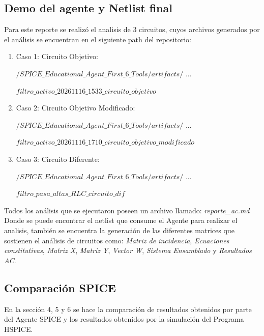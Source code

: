 \subsection{Demo del agente y Netlist final}
Para este reporte se realizó el analisis de 3 circuitos, cuyos archivos generados por el análisis se encuentran en el siguiente path del repositorio:

\begin{enumerate}
\item Caso 1: Circuito Objetivo:

$/SPICE\_Educational\_Agent\_First\_6\_Tools/artifacts/$ ...

$filtro\_activo\_20261116\_1533\_circuito\_objetivo$

\item Caso 2: Circuito Objetivo Modificado:

$/SPICE\_Educational\_Agent\_First\_6\_Tools/artifacts/$ ...

$filtro\_activo\_20261116\_1710\_circuito\_objetivo\_modificado$

\item Caso 3: Circuito Diferente:

$/SPICE\_Educational\_Agent\_First\_6\_Tools/artifacts/$ ...

$filtro\_pasa\_altas\_RLC\_circuito\_dif$

\end{enumerate}

Todos los análisis que se ejecutaron poseen un archivo llamado: \textit{reporte\_ac.md} 
Donde se puede encontrar el netlist que consume el Agente para realizar el analisis, también se encuentra la generación de las diferentes matrices que sostienen el análisis de circuitos como: \textit{Matriz de incidencia}, \textit{Ecuaciones constitutivas}, \textit{Matriz X}, \textit{Matriz Y}, \textit{Vector W}, \textit{Sistema Ensamblado} y \textit{Resultados AC}.

\subsection{Comparación SPICE}

En la sección 4, 5 y 6 se hace la comparación de resultados obtenidos por parte del Agente SPICE y los resultados obtenidos por la simulación del Programa HSPICE.